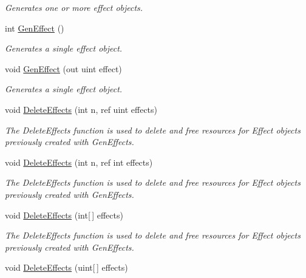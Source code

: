 \begin{DoxyCompactItemize}
\begin{DoxyCompactList}\small\item\em Generates one or more effect objects.\end{DoxyCompactList}\item 
int \hyperlink{class_open_t_k_1_1_audio_1_1_open_a_l_1_1_effects_extension_aba577b14af247d69f95f6c859511549e}{Gen\-Effect} ()
\begin{DoxyCompactList}\small\item\em Generates a single effect object.\end{DoxyCompactList}\item 
void \hyperlink{class_open_t_k_1_1_audio_1_1_open_a_l_1_1_effects_extension_a48080e822c0b3d2e41c524d4535b22dd}{Gen\-Effect} (out uint effect)
\begin{DoxyCompactList}\small\item\em Generates a single effect object.\end{DoxyCompactList}\item 
void \hyperlink{class_open_t_k_1_1_audio_1_1_open_a_l_1_1_effects_extension_a25d3d56982cbd0fcab35dede97a6503f}{Delete\-Effects} (int n, ref uint effects)
\begin{DoxyCompactList}\small\item\em The Delete\-Effects function is used to delete and free resources for Effect objects previously created with Gen\-Effects.\end{DoxyCompactList}\item 
void \hyperlink{class_open_t_k_1_1_audio_1_1_open_a_l_1_1_effects_extension_a19699b0a2538db96da21ed41e160966a}{Delete\-Effects} (int n, ref int effects)
\begin{DoxyCompactList}\small\item\em The Delete\-Effects function is used to delete and free resources for Effect objects previously created with Gen\-Effects.\end{DoxyCompactList}\item 
void \hyperlink{class_open_t_k_1_1_audio_1_1_open_a_l_1_1_effects_extension_a9be846087b2d226614b94c10f41d021e}{Delete\-Effects} (int\mbox{[}$\,$\mbox{]} effects)
\begin{DoxyCompactList}\small\item\em The Delete\-Effects function is used to delete and free resources for Effect objects previously created with Gen\-Effects.\end{DoxyCompactList}\item 
void \hyperlink{class_open_t_k_1_1_audio_1_1_open_a_l_1_1_effects_extension_a26ae8a2e06f73c1d16c42db9aadb8b9a}{Delete\-Effects} (uint\mbox{[}$\,$\mbox{]} effects)

\end{DoxyCompactItemize}
